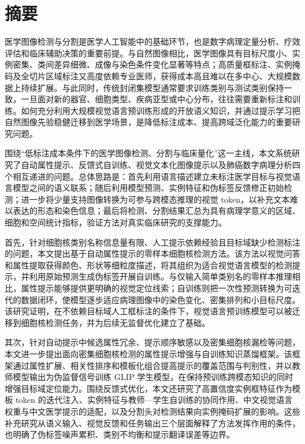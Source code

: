 \chapter*{摘要}
医学图像检测与分割是医学人工智能中的基础环节，也是数字病理定量分析、疗效评估和临床辅助决策的重要前提。与自然图像相比，医学图像具有目标尺度小、实例密集、类间差异细微、成像与染色条件变化显著等特点；高质量框标注、实例掩码及全切片区域标注又高度依赖专业医师，获得成本高且难以在多中心、大规模数据上持续扩展。与此同时，传统封闭集模型通常要求训练类别与测试类别保持一致，一旦面对新的器官、细胞类型、疾病亚型或中心分布，往往需要重新标注和训练。如何充分利用大规模视觉语言预训练形成的开放语义知识，并通过提示学习把自然图像先验稳健迁移到医学场景，是降低标注成本、提高跨域泛化能力的重要研究问题。

围绕“低标注成本条件下的医学图像检测、分割与临床量化”这一主线，本文系统研究了自动属性提示、反馈式自训练、视觉文本化图像提示以及肺癌数字病理分析四个相互递进的问题。总体思路是：首先利用语言描述建立未标注医学目标与视觉语言模型之间的语义联系；随后利用模型预测、实例特征和伪标签反馈修正初始检测；进一步将少量支持图像转换为可参与跨模态推理的视觉 token，以补充文本难以表达的形态和染色信息；最后将检测、分割结果汇总为具有病理学意义的区域、细胞和空间统计指标，验证方法对真实临床研究的支撑能力。

首先，针对细胞核类别名称信息量有限、人工提示依赖经验且目标域缺少检测标注的问题，本文提出基于自动属性提示的零样本细胞核检测方法。该方法以视觉问答和属性提取获得颜色、形状等细粒度描述，将其组织为适合视觉语言模型的检测提示，并利用原始预测生成伪标签开展自训练。与仅输入简单类别名的零样本推理相比，属性提示能够提供更明确的视觉定位线索；自训练则把一次性预测转换为可迭代的数据闭环，使模型逐步适应病理图像中的染色变化、密集排列和小目标尺度。该研究证明，在不依赖目标域人工框标注的条件下，视觉语言预训练模型可以被迁移到细胞核检测任务，并为后续无监督优化建立了基础。

其次，针对自动提示中候选属性冗余、提示顺序敏感以及密集细胞核漏检等问题，本文进一步提出面向密集细胞核检测的属性提示增强与自训练知识蒸馏框架。该框架通过属性扩展、相关性排序和模板化组合提高提示的覆盖范围与判别性，并以教师模型输出为伪监督信号训练 GLIP 学生模型，在保持预训练跨模态知识的同时增强目标域定位能力。围绕反馈式优化，本文还研究了高置信度实例框特征作为模板 token 的迭代注入、实例特征与教师—学生自训练的协同作用、中文视觉语言权重与中文医学提示的适配，以及分割头对检测结果向实例掩码扩展的影响。这些补充研究从语义输入、视觉反馈和任务输出三个层面解释了方法发挥作用的条件，也明确了伪标签噪声累积、类别不均衡和提示翻译误差等边界。

